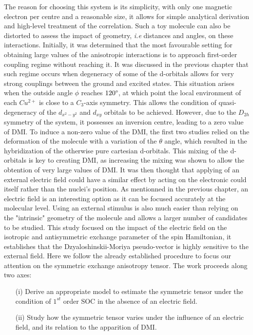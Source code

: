 \documentclass[10pt]{report}
\numberwithin{equation}{section}
\begin{document}
The reason for choosing this system is its simplicity, with only one magnetic electron per centre and a reasonable size, it allows for simple analytical derivation and high-level treatment of the correlation.
Such a toy molecule can also be distorted to assess the impact of geometry, \textit{i.e} distances and angles, on these interactions.
Initially, it was determined that the most favourable setting for obtaining large values of the anisotropic interactions is to approach first-order coupling regime without reaching it.
It was discussed in the previous chapter that such regime occurs when degeneracy of some of the d-orbitals allows for very strong couplings between the ground and excited states.
This situation arises when the outside angle $\phi$ reaches $120 \degree$, at which point the local environment of each $Cu^{2+}$ is close to a $C_3$-axis symmetry.
This allows the condition of quasi-degeneracy of the $d_{x^2-y^2}$ and $d_{xy}$ orbitals to be achieved. However, due to the $D_{2h}$ symmetry of the system, it possesses an inversion centre, leading to a zero value of DMI.
To induce a non-zero value of the DMI, the first two studies relied on the deformation of the molecule with a variation of the $\theta$ angle, which resulted in the hybridization of the otherwise pure cartesian d-orbitals.
This mixing of the d-orbitals is key to creating DMI, as increasing the mixing was shown to allow the obtention of very large values of DMI.
It was then thought that applying of an external electric field could have a similar effect by acting on the electronic could itself rather than the nuclei's position.
As mentionned in the previous chapter, an electric field is an interesting option as it can be focused accurately at the molecular level. 
Using an external stimulus is also much easier than relying on the "intrinsic" geometry of the molecule and allows a larger number of candidates to be studied.
This study focused on the impact of the electric field on the isotropic and antisymmetric exchange parameter of the spin Hamiltonian, it establishes that the Dzyaloshinskii-Moriya pseudo-vector is highly sensitive to the external field.
Here we follow the already established procedure to focus our attention on the symmetric exchange anisotropy tensor.
The work proceeds along two axes:
\begin{itemize}
    \item[(i)] Derive an appropriate model to estimate the symmetric tensor under the condition of $1^{st}$ order SOC in the absence of an electric field.
    \item[(ii)] Study how the symmetric tensor varies under the influence of an electric field, and its relation to the apparition of DMI.
\end{itemize}
\end{document}
